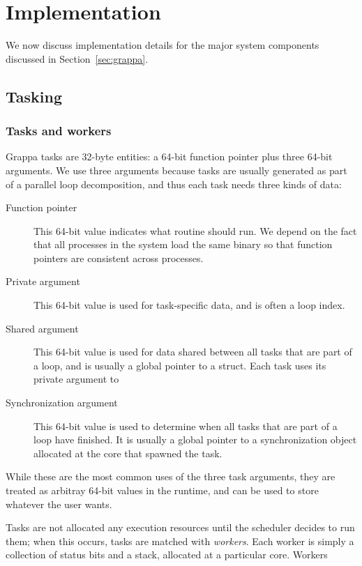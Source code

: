 \section{Implementation} \label{sec:implementation}

We now discuss implementation details for the major system components discussed in Section~\ref{sec:grappa}.

\subsection{Tasking}

\subsubsection{Tasks and workers}

Grappa tasks are 32-byte entities: a 64-bit function pointer plus
three 64-bit arguments. We use three arguments because tasks are
usually generated as part of a parallel loop decomposition, and thus
each task needs three kinds of data:
\begin{description}
\item[Function pointer] This 64-bit value indicates what routine
  should run. We depend on the fact that all processes in the system
  load the same binary so that function pointers are consistent across
  processes.
\item[Private argument] This 64-bit value is used for task-specific
  data, and is often a loop index.
\item[Shared argument] This 64-bit value is used for data shared
  between all tasks that are part of a loop, and is usually a global
  pointer to a struct. Each task uses its private argument to 
\item[Synchronization argument] This 64-bit value is used to determine
  when all tasks that are part of a loop have finished. It is usually
  a global pointer to a synchronization object allocated at the core
  that spawned the task.
\end{description}
While these are the most common uses of the three task arguments, they
are treated as arbitray 64-bit values in the runtime, and can be used
to store whatever the user wants.

Tasks are not allocated any execution resources until the scheduler
decides to run them; when this occurs, tasks are matched with {\em
  workers}. Each worker is simply a collection of status bits and a
stack, allocated at a particular core. Workers 


